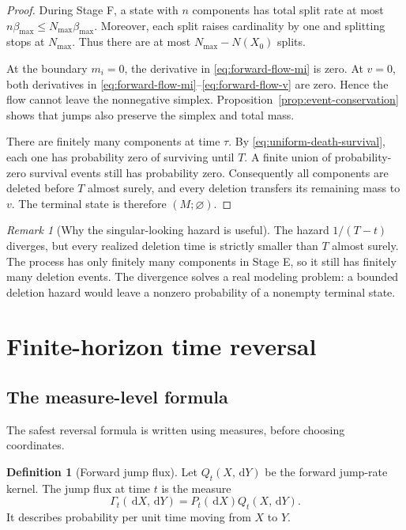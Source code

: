 \documentclass[10pt]{article}
\theoremstyle{definition}
\newtheorem{definition}[theorem]{Definition}
\theoremstyle{remark}
\newtheorem{remark}[theorem]{Remark}
\newcommand{\dd}{\,\mathrm{d}}
\begin{document}
\begin{proof}
During Stage F, a state with $n$ components has total split rate at most
$n\beta_{\max}\leq N_{\max}\beta_{\max}$.  Moreover, each split raises
cardinality by one and splitting stops at $N_{\max}$.  Thus there are at most
$N_{\max}-N(X_0)$ splits.

At the boundary $m_i=0$, the derivative in \eqref{eq:forward-flow-mi} is zero.  At $v=0$, both derivatives in \eqref{eq:forward-flow-mi}--\eqref{eq:forward-flow-v} are zero.  Hence the flow cannot leave the nonnegative simplex.  Proposition~\ref{prop:event-conservation} shows that jumps also preserve the simplex and total mass.

There are finitely many components at time $\tau$.  By \eqref{eq:uniform-death-survival}, each one has probability zero of surviving until $T$.  A finite union of probability-zero survival events still has probability zero.  Consequently all components are deleted before $T$ almost surely, and every deletion transfers its remaining mass to $v$.  The terminal state is therefore $(M;\varnothing)$.
\end{proof}

\begin{remark}[Why the singular-looking hazard is useful]
The hazard $1/(T-t)$ diverges, but every realized deletion time is strictly smaller than $T$ almost surely.  The process has only finitely many components in Stage E, so it still has finitely many deletion events.  The divergence solves a real modeling problem: a bounded deletion hazard would leave a nonzero probability of a nonempty terminal state.
\end{remark}

\section{Finite-horizon time reversal}
\label{sec:reverse}

\subsection{The measure-level formula}

The safest reversal formula is written using measures, before choosing coordinates.

\begin{definition}[Forward jump flux]
Let $Q_t(X,\dd Y)$ be the forward jump-rate kernel.  The jump flux at time $t$ is the measure
\begin{equation}
  \Gamma_t(\dd X,\dd Y)
  =P_t(\dd X)Q_t(X,\dd Y).
  \label{eq:forward-flux}
\end{equation}
It describes probability per unit time moving from $X$ to $Y$.
\end{definition}
\end{document}

